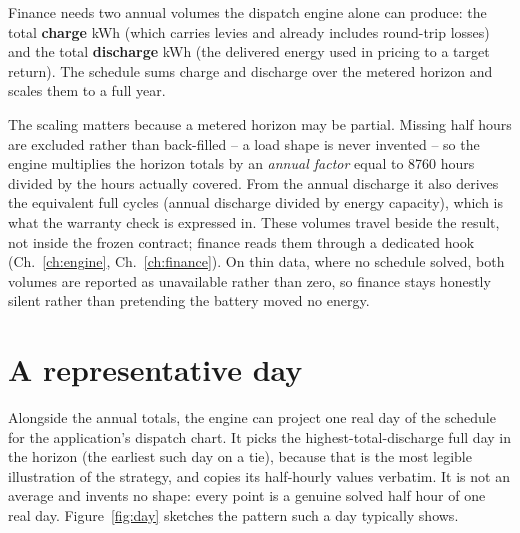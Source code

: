 Finance needs two annual volumes the dispatch engine alone can produce: the total \textbf{charge} kWh (which carries levies and already includes round-trip losses) and the total \textbf{discharge} kWh (the delivered energy used in pricing to a target return). The schedule sums charge and discharge over the metered horizon and scales them to a full year.

The scaling matters because a metered horizon may be partial. Missing half hours are excluded rather than back-filled -- a load shape is never invented -- so the engine multiplies the horizon totals by an \emph{annual factor} equal to 8760 hours divided by the hours actually covered. From the annual discharge it also derives the equivalent full cycles (annual discharge divided by energy capacity), which is what the warranty check is expressed in. These volumes travel beside the result, not inside the frozen contract; finance reads them through a dedicated hook (Ch.~\ref{ch:engine}, Ch.~\ref{ch:finance}). On thin data, where no schedule solved, both volumes are reported as unavailable rather than zero, so finance stays honestly silent rather than pretending the battery moved no energy.

\section{A representative day}

Alongside the annual totals, the engine can project one real day of the schedule for the application's dispatch chart. It picks the highest-total-discharge full day in the horizon (the earliest such day on a tie), because that is the most legible illustration of the strategy, and copies its half-hourly values verbatim. It is not an average and invents no shape: every point is a genuine solved half hour of one real day. Figure~\ref{fig:day} sketches the pattern such a day typically shows.

